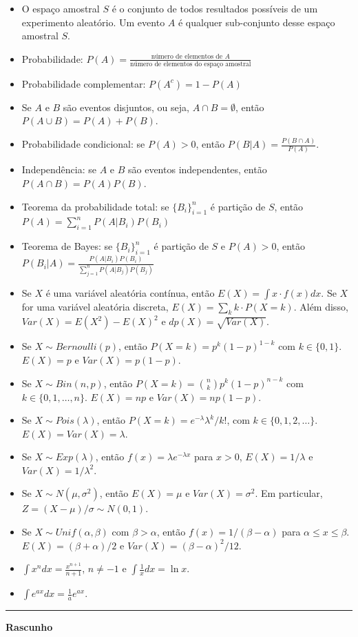 \documentclass{article}
\begin{document}
\begin{small}
\begin{itemize}
	\item O espaço amostral $S$ é o conjunto de todos resultados possíveis de um experimento aleatório. Um evento $A$ é qualquer sub-conjunto desse espaço amostral $S$.
	\item Probabilidade: $P(A) = \frac{\text{número de elementos de $A$}}{\text{número de elementos do espaço amostral}}$
	\item Probabilidade complementar: $P(A^c) = 1 - P(A)$
	\item Se $A$ e $B$ são eventos disjuntos, ou seja, $A\cap B = \emptyset$, então $P(A \cup B) = P(A) + P(B)$.
	\item Probabilidade condicional: se $P(A)>0$, então $P(B|A) = \frac{P(B \cap A)}{P(A)}$.
	\item Independência: se $A$ e $B$ são eventos independentes, então $P(A \cap B) = P(A) P(B)$.
	\item Teorema da probabilidade total: se $\{B_i\}_{i=1}^n$ é partição de $S$, então $P(A) = \sum_{i=1}^n P(A|B_i) P(B_i)$
	\item Teorema de Bayes: se $\{B_i\}_{i=1}^n$ é partição de $S$ e $P(A)>0$, então $P(B_i | A) = \frac{P(A|B_i) P(B_i)}{\sum_{j=1}^n P(A|B_j) P(B_j)} $
\item Se $X$ é uma variável aleatória contínua, então $E(X) = \int x \cdot f(x)dx$. Se $X$ for uma variável aleatória discreta, $E(X) = \sum_k  k \cdot P(X=k)$.  Além disso, $Var(X) = E(X^2) - E(X)^2$ e $dp(X) = \sqrt{Var(X)}$.
\item Se $X\sim Bernoulli(p)$, então $P(X=k) = p^k (1 - p)^{1 - k}$ com $k\in\{0, 1\}$. $E(X) = p$ e $Var(X) = p(1 - p)$.
\item Se $X\sim Bin(n, p)$, então $P(X=k) = \binom{n}{k} p^k (1 - p)^{n - k}$ com $k\in\{0, 1, \ldots, n\}$. $E(X) = n p$ e $Var(X) = n p(1 - p)$.
\item Se $X\sim Pois(\lambda)$, então $P(X=k)=e^{-\lambda}\lambda^k/k!$, com $k\in\{0,1,2,\ldots\}$. $E(X)=Var(X)=\lambda$.
\item Se $X\sim Exp(\lambda)$, então $f(x) = \lambda e^{-\lambda x}$ para $x>0$, $E(X) = 1/\lambda$ e $Var(X) = 1/\lambda^2$.
\item Se $X\sim N(\mu, \sigma^2)$, então $E(X) = \mu$ e $Var(X) = \sigma^2$. Em particular, $Z = (X - \mu)/\sigma \sim N(0,1)$.
\item Se $X\sim Unif(\alpha, \beta)$ com $\beta>\alpha$, então $f(x)=1/(\beta - \alpha)$ para $\alpha\leq x \leq \beta$. $E(X) = (\beta + \alpha)/2$ e $Var(X) = (\beta - \alpha)^2/12$.
\item $\int x^n dx = \frac{x^{n+1}}{n+1}$, $n\neq -1$ e $\int \frac{1}{x} dx = \ln x$.
\item $\int e^{ax} dx = \frac{1}{a} e^{ax}$.	
\end{itemize}
\end{small}

\newpage
\begin{center}
	\noindent\rule{15cm}{0.4pt}
	\Large{\textbf{Rascunho}}
\end{center}
\end{document}
